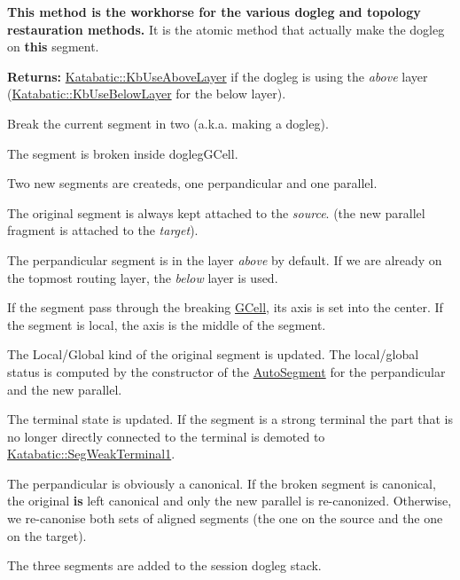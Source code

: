 {\bfseries This method is the workhorse for the various dogleg and topology restauration methods.} It is the atomic method that actually make the dogleg on {\bfseries this} segment.

{\bfseries Returns\+:} \mbox{\hyperlink{namespaceKatabatic_a2af2ad6b6441614038caf59d04b3b217af756099f1bbe259dd1bf22067dc40eac}{Katabatic\+::\+Kb\+Use\+Above\+Layer}} if the dogleg is using the {\itshape above} layer (\mbox{\hyperlink{namespaceKatabatic_a2af2ad6b6441614038caf59d04b3b217a41cbd981337678e042354f340bfae25d}{Katabatic\+::\+Kb\+Use\+Below\+Layer}} for the below layer).

Break the current segment in two (a.\+k.\+a. making a dogleg).
\begin{DoxyItemize}
\item The segment is broken inside {\ttfamily dogleg\+G\+Cell}.
\item Two new segments are createds, one perpandicular and one parallel.
\item The original segment is always kept attached to the {\itshape source}. (the new parallel fragment is attached to the {\itshape target}).
\item The perpandicular segment is in the layer {\itshape above} by default. If we are already on the topmost routing layer, the {\itshape below} layer is used.
\item If the segment pass through the breaking \mbox{\hyperlink{classKatabatic_1_1GCell}{G\+Cell}}, it\textquotesingle{}s axis is set into the center. If the segment is local, the axis is the middle of the segment.
\item The Local/\+Global kind of the original segment is updated. The local/global status is computed by the constructor of the \mbox{\hyperlink{classKatabatic_1_1AutoSegment}{Auto\+Segment}} for the perpandicular and the new parallel.
\item The terminal state is updated. If the segment is a strong terminal the part that is no longer directly connected to the terminal is demoted to \mbox{\hyperlink{namespaceKatabatic_a94585537ee1724ea9315578ec54380f4a7b3e09b8ab4cf676fd308535d7fba892}{Katabatic\+::\+Seg\+Weak\+Terminal1}}.
\item The perpandicular is obviously a canonical. If the broken segment is canonical, the original {\bfseries is} left canonical and only the new parallel is re-\/canonized. Otherwise, we re-\/canonise both sets of aligned segments (the one on the source and the one on the target).
\item The three segments are added to the session dogleg stack.
\end{DoxyItemize}

